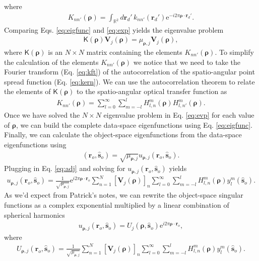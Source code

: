 \documentclass[11pt]{article}
\newcommand{\me}{\mathrm{e}}
\providecommand{\mb}[1]{\mathbf{#1}}
\providecommand{\ro}[1]{\mathbf{\mathbf{r}}_o}
\providecommand{\so}[1]{\mathbf{\hat{s}}_o}
\providecommand{\rd}[1]{\mathbf{r}_d}
\providecommand{\mbb}[1]{\mathbb{#1}}
\providecommand{\bs}[1]{\boldsymbol{#1}}
\begin{document}
where
\begin{align}
  K_{nn'}(\bs{\rho}) = \int_{\mbb{R}^2}d\rd{}'\, k_{nn'}(\rd{}')\me{}^{-i 2\pi \bs{\rho}\cdot\rd{}'}. \label{eq:kft}
\end{align}
Comparing Eqs. \ref{eq:eigfunc} and \ref{eq:exp} yields the eigenvalue problem
\begin{align}
  \mathsf{K}(\bs{\rho})\mb{V}_j(\bs{\rho}) = \mu_{\bs{\rho}, j}\mb{V}_j(\bs{\rho}), \label{eq:evp}
\end{align}
where $\mathsf{K}(\bs{\rho})$ is an $N\times N$ matrix containing the elements
$K_{nn'}(\bs{\rho})$. To simplify the calculation of the elements
$K_{nn'}(\bs{\rho})$ we notice that we need to take the Fourier transform (Eq.
\ref{eq:kft}) of the autocorrelation of the spatio-angular point spread function
(Eq. \ref{eq:kern}). We can use the autocorrelation theorem to relate the
elements of $\mathsf{K}(\bs{\rho})$ to the spatio-angular optical transfer
function as
\begin{align}
  K_{nn'}(\bs{\rho}) = \sum_{l=0}^{\infty}\sum_{m=-l}^l H_{l,n}^m(\bs{\rho}) H_{l,n'}^m(\bs{\rho}). \label{eq:ksimp}
\end{align}
Once we have solved the $N\times N$ eigenvalue problem in Eq. \ref{eq:evp} for
each value of $\bs{\rho}$, we can build the complete data-space eigenfunctions using
Eq. \ref{eq:eigfunc}. Finally, we can calculate the object-space eigenfunctions from
the data-space eigenfunctions using
\begin{align}
  [\mathcal{H}^{\dagger}\mb{v}_{\bs{\rho},j}](\ro{}, \so{}) = \sqrt{\mu_{\bs{\rho}, j}}u_{\bs{\rho},j}(\ro{}, \so{}).
\end{align}
Plugging in Eq. \ref{eq:adj} and solving for $u_{\bs{\rho},j}(\ro{}, \so{})$ yields
\begin{align}
  u_{\bs{\rho},j}(\ro{}, \so{}) = \frac{1}{\sqrt{\mu_{\bs{\rho},j}}}\me{}^{i2\pi\bs{\rho}\cdot\ro{}}\sum_{n=1}^N[\mb{V}_j(\bs{\rho})]_n \sum_{l=0}^{\infty}\sum_{m=-l}^l H_{l,n}^m(\bs{\rho})y_l^m(\so{}).
\end{align}
As we'd expect from Patrick's notes, we can rewrite the object-space singular
functions as a complex exponential multiplied by a linear combination of
spherical harmonics
\begin{align}
u_{\bs{\rho},j}(\ro{}, \so{}) = U_j(\bs{\rho}, \so{}) \me{}^{i2\pi\bs{\rho}\cdot\ro{}},
\end{align}
where
\begin{align}
  U_{\bs{\rho},j}(\ro{}, \so{}) = \frac{1}{\sqrt{\mu_{\bs{\rho},j}}}\sum_{n=1}^N[\mb{V}_j(\bs{\rho})]_n \sum_{l=0}^{\infty}\sum_{m=-l}^l H_{l,n}^m(\bs{\rho})y_l^m(\so{}).
\end{align}
\end{document}

